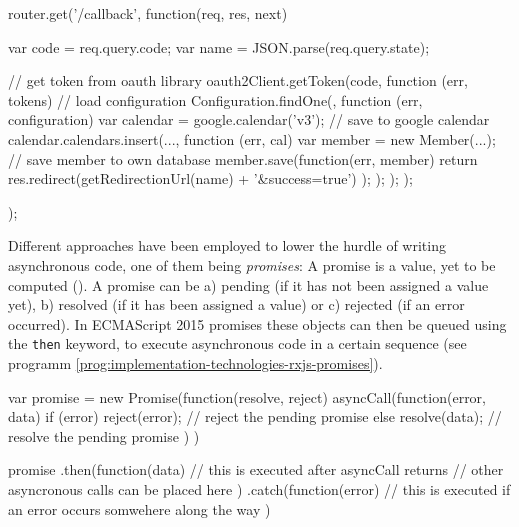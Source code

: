 \begin{program}
\caption{\emph{Callback Hell} -- Nested callbacks in JavaScript. Simplified method taken from a previous project, which authenticates a user, creates a new google calendar for them and then saves the user to one\'s own database, to then redirect them. \texttt{\{...\}} is used to shorten the code, error-handling was also omitted in the example for simplicity.}
\label{prog:implementation-technologies-rxjs-callback-hell}
\begin{JsCode}
router.get('/callback', function(req, res, next) {
  var code = req.query.code;
  var name = JSON.parse(req.query.state);

  // get token from oauth library
  oauth2Client.getToken(code, function (err, tokens) {
    // load configuration
    Configuration.findOne({}, function (err, configuration) {
      var calendar = google.calendar('v3');
      // save to google calendar
      calendar.calendars.insert({...}, function (err, cal) {
        var member = new Member({...});
        // save member to own database
        member.save(function(err, member) {
          return res.redirect(getRedirectionUrl(name) + '&success=true')
        });
      });
    });
  });
});
\end{JsCode}
\end{program}

Different approaches have been employed to lower the hurdle of writing asynchronous code, one of them being \emph{promises}: A promise is a value, yet to be computed (\cite{reactive-vs-promises}). A promise can be a) pending (if it has not been assigned a value yet), b) resolved (if it has been assigned a value) or c) rejected (if an error occurred). In ECMAScript 2015 promises these objects can then be queued using the \texttt{then} keyword, to execute asynchronous code in a certain sequence (see programm \ref{prog:implementation-technologies-rxjs-promises}).

\begin{program}
\caption{\emph{Promises} -- Simple example of chaining ECMAScript 2015 promises with \texttt{then} and \texttt{catch}.}
\label{prog:implementation-technologies-rxjs-promises}
\begin{JsCode}
var promise = new Promise(function(resolve, reject) {
  asyncCall(function(error, data) {
    if (error) {
      reject(error); // reject the pending promise
    } else {
      resolve(data); // resolve the pending promise
    }
  })
})

promise
  .then(function(data) {
    // this is executed after asyncCall returns
    // other asyncronous calls can be placed here
  })
  .catch(function(error) {
    // this is executed if an error occurs somwehere along the way
  })
\end{JsCode}
\end{program}

